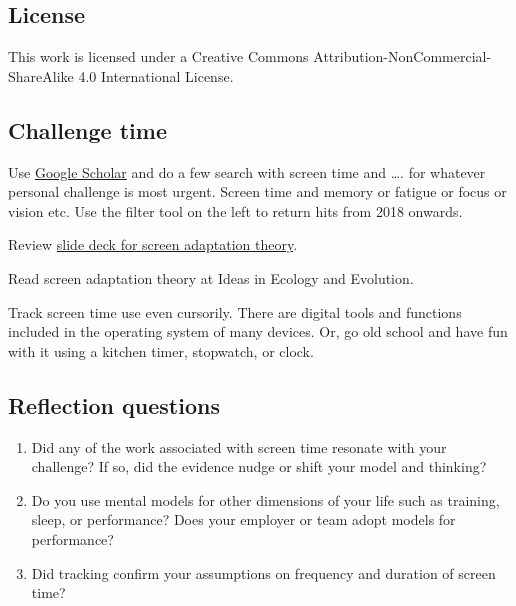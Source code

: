\documentclass[
]{book}
\providecommand{\tightlist}{%
  \setlength{\itemsep}{0pt}\setlength{\parskip}{0pt}}
\begin{document}
\hypertarget{license}{%
\subsection*{License}\label{license}}

This work is licensed under a Creative Commons Attribution-NonCommercial-ShareAlike 4.0 International License.

\hypertarget{challenge-time}{%
\subsection*{Challenge time}\label{challenge-time}}

Use \href{https://scholar.google.com}{Google Scholar} and do a few search with screen time and \ldots. for whatever personal challenge is most urgent. Screen time and memory or fatigue or focus or vision etc. Use the filter tool on the left to return hits from 2018 onwards.

Review \href{https://figshare.com/articles/presentation/Screen_attention_theory/19686291}{slide deck for screen adaptation theory}.

Read screen adaptation theory at Ideas in Ecology and Evolution.

Track screen time use even cursorily. There are digital tools and functions included in the operating system of many devices. Or, go old school and have fun with it using a kitchen timer, stopwatch, or clock.

\hypertarget{reflection-questions}{%
\subsection*{Reflection questions}\label{reflection-questions}}

\begin{enumerate}
\def\labelenumi{\arabic{enumi}.}
\tightlist
\item
  Did any of the work associated with screen time resonate with your challenge? If so, did the evidence nudge or shift your model and thinking?
\item
  Do you use mental models for other dimensions of your life such as training, sleep, or performance? Does your employer or team adopt models for performance?
\item
  Did tracking confirm your assumptions on frequency and duration of screen time?
\end{enumerate}
\end{document}
